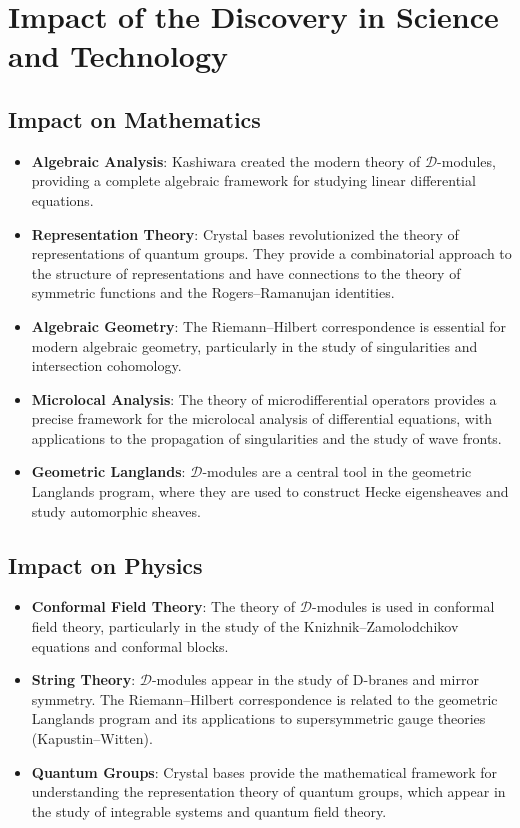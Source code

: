 \section{Impact of the Discovery in Science and Technology}

\subsection{Impact on Mathematics}

\begin{itemize}
\item \textbf{Algebraic Analysis}: Kashiwara created the modern theory of $\mathcal{D}$-modules, providing a complete algebraic framework for studying linear differential equations.

\item \textbf{Representation Theory}: Crystal bases revolutionized the theory of representations of quantum groups. They provide a combinatorial approach to the structure of representations and have connections to the theory of symmetric functions and the Rogers--Ramanujan identities.

\item \textbf{Algebraic Geometry}: The Riemann--Hilbert correspondence is essential for modern algebraic geometry, particularly in the study of singularities and intersection cohomology.

\item \textbf{Microlocal Analysis}: The theory of microdifferential operators provides a precise framework for the microlocal analysis of differential equations, with applications to the propagation of singularities and the study of wave fronts.

\item \textbf{Geometric Langlands}: $\mathcal{D}$-modules are a central tool in the geometric Langlands program, where they are used to construct Hecke eigensheaves and study automorphic sheaves.
\end{itemize}

\subsection{Impact on Physics}

\begin{itemize}
\item \textbf{Conformal Field Theory}: The theory of $\mathcal{D}$-modules is used in conformal field theory, particularly in the study of the Knizhnik--Zamolodchikov equations and conformal blocks.

\item \textbf{String Theory}: $\mathcal{D}$-modules appear in the study of D-branes and mirror symmetry. The Riemann--Hilbert correspondence is related to the geometric Langlands program and its applications to supersymmetric gauge theories (Kapustin--Witten).

\item \textbf{Quantum Groups}: Crystal bases provide the mathematical framework for understanding the representation theory of quantum groups, which appear in the study of integrable systems and quantum field theory.
\end{itemize}

